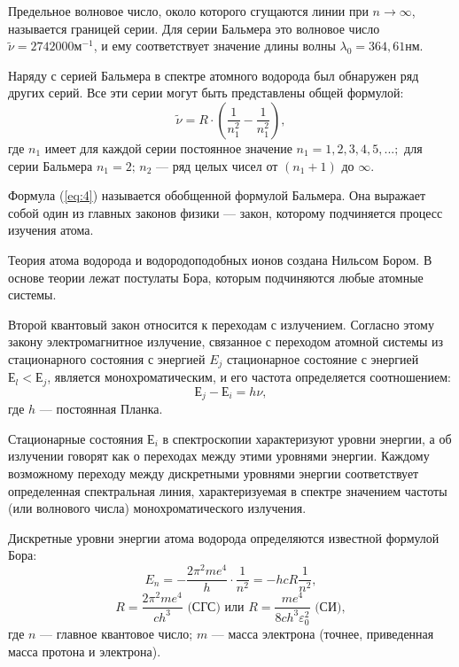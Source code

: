 \documentclass[12pt]{article}
\let\oldref\ref
\renewcommand{\ref}[1]{(\oldref{#1})}
\begin{document}
    Предельное  волновое  число, около которого сгущаются линии при $ n \to \infty $,  называется границей  серии. Для  серии  Бальмера  это  волновое число $ \widetilde{\nu} = 2742000м^{-1}$,    и    ему соответствует  значение  длины  волны $ \lambda_0 =364,61нм $.

    Наряду  с  серией  Бальмера  в спектре   атомного   водорода   был обнаружен ряд других серий. Все эти серии   могут   быть   представлены общей формулой:
    \begin{equation}
        \label{eq:4}
        \widetilde{\nu} = R \cdot \left( \frac{1}{n^2_1} - \frac{1}{n^2_1} \right),
    \end{equation}
    где $ n_1 $ имеет для каждой серии постоянное значение $ n_1 =1,  2,  3,  4, 5,...; $ для серии Бальмера $ n_1 = 2; \, n_2 $ --- ряд целых чисел от $ (n_1 + 1) $ до $ \infty $.

    Формула  \ref{eq:4}   называется обобщенной формулой Бальмера. Она выражает собой один из главных законов физики  --- закон, которому подчиняется процесс изучения атома.

    Теория атома водорода и водородоподобных ионов создана Нильсом Бором. В основе теории лежат постулаты Бора, которым подчиняются любые атомные системы.

    Второй квантовый закон относится к переходам с излучением. Согласно этому закону электромагнитное  излучение,  связанное  с  переходом  атомной  системы  из  стационарного состояния  с  энергией $ E_j $  стационарное  состояние  с  энергией $ Е_l < Е_j $,  является монохроматическим, и его частота определяется соотношением:
    \begin{equation}
        \label{eq:5}
        Е_j - Е_i = h \nu,
    \end{equation}
    где $ h $ --- постоянная Планка.

    Стационарные  состояния $ Е_i $ в  спектроскопии  характеризуют  уровни  энергии,  а  об излучении  говорят  как  о  переходах  между  этими  уровнями  энергии.  Каждому возможному переходу  между  дискретными  уровнями  энергии  соответствует  определенная  спектральная линия,   характеризуемая   в   спектре   значением   частоты   (или   волнового   числа) монохроматического излучения.

    Дискретные уровни энергии атома водорода определяются известной формулой Бора:
    \begin{equation}
        \label{eq:6}
        E_n = - \frac{2 \pi^2 m e^4}{h} \cdot \frac{1}{n^2} = - h c R \frac{1}{n^2},
    \end{equation}
    \begin{equation}
        \label{eq:7}
        R = \frac{2 \pi^2 m e^4}{c h^3} \text{ (СГС) или } R = \frac{m e^4}{8 c h^3 \varepsilon^2_0} \text{ (СИ)},
    \end{equation}
    где  $ n $ --- главное квантовое число; $ m $ --- масса электрона (точнее, приведенная масса протона и электрона).
\end{document}
